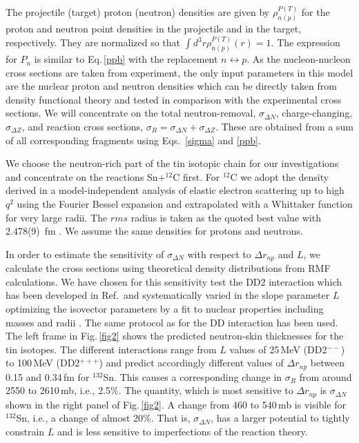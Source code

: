 \documentclass[english,aps,prl,twocolumn,superscriptaddress]{revtex4}
\begin{document}
%
The projectile (target) proton (neutron) densities are given by $\rho_{n(p)}^{P(T)}$ for the proton and neutron point densities in the projectile and in the target, respectively. They are normalized so that $\int d^3r\rho^{P(T)}_{n(p)} (r) = 1$. The expression for $P_n$ is similar to Eq.\,\eqref{ppb} with the replacement $n \leftrightarrow p$.  As the nucleon-nucleon cross sections are taken from experiment, the only input parameters in this model are the nuclear proton and neutron densities which can be directly taken from density functional theory and tested in comparison with the experimental cross sections. We will concentrate on the total neutron-removal, $\sigma_{\Delta N}$, charge-changing,  $\sigma_{\Delta Z}$, and reaction cross sections, $\sigma_{R}=\sigma_{\Delta N}+\sigma_{\Delta Z}$. These are obtained from a sum of all corresponding fragments using Eqs. \,\eqref{sigma} and \eqref{ppb}. 

We choose the neutron-rich part of the tin isotopic chain for our investigations and concentrate on the reactions Sn+$^{12}$C first. For $^{12}$C we adopt the density derived in a model-independent analysis of elastic electron scattering up to high $q^2$ using the Fourier Bessel expansion \cite{Off91} and extrapolated with a Whittaker function for very large radii. The $rms$ radius is taken as the quoted best value with 2.478(9)\ fm \cite{Off91}. We assume the same densities for protons and neutrons.

In order to estimate the sensitivity of $\sigma_{\Delta N}$ with respect to $\Delta r_{np}$ and $L$, we calculate the cross sections using theoretical density distributions from RMF calculations. We have chosen for this sensitivity test the DD2 interaction which has been developed in Ref.\,\cite{Typ10}  and systematically varied in the slope parameter $L$ optimizing the isovector parameters by a fit to nuclear properties including masses and radii \cite{Typ14}. The same protocol as for the DD interaction \cite{Typ05} has been used. The left frame in Fig.\,\ref{fig2} shows the predicted neutron-skin thicknesses for the tin isotopes. The different interactions range from $L$ values of 25\,MeV (DD2$^{--}$) to 100\,MeV (DD2$^{+++}$) and predict accordingly different values of $\Delta r_{np}$ between 0.15 and 0.34\,fm for $^{132}$Sn. This causes a corresponding change in $\sigma_{R}$ from around 2550 to 2610\,mb, i.e., 2.5\%. The quantity, which is most sensitive to $\Delta r_{np}$ is $\sigma_{\Delta N}$ shown in the right panel of Fig.\,\ref{fig2}. A change from 460 to 540\,mb is visible for $^{132}$Sn, i.e., a change of almost 20\%. That is, $\sigma_{\Delta N}$, has a larger potential to tightly constrain $L$ and is less sensitive to imperfections of the reaction theory.
\end{document}
